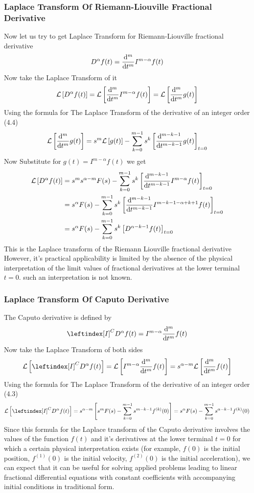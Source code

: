 \subsubsection{Laplace Transform Of Riemann-Liouville Fractional Derivative}
Now let us try to get Laplace Transform for Riemann-Liouville fractional derivative
\[
    D^{\alpha} f(t) = \dv[m]{}{t} I^{m-\alpha} f(t)
\]
Now take the Laplace Transform of it 
\[
    \mathcal{L}\left[ D^{\alpha} f(t) \right]  = \mathcal{L}\left[ \dv[m]{}{t} I^{m-\alpha} f(t) \right] = \mathcal{L}\left[ \dv[m]{}{t} g(t) \right]
\]
Using the formula for The Laplace Transform of the derivative of an integer order (4.4)
\[
    \mathcal{L}\left[ \dv[m]{}{t} g(t) \right] = s^m \mathcal{L}\left[ g(t) \right] - \sum_{k=0}^{m-1} s^k \left[\dv[m-k-1]{}{t}g(t)\right]_{t=0}
\]
Now Substitute for $g(t) = I^{m-\alpha} f(t)$ we get
\begin{align*}
    \mathcal{L}\left[ D^{\alpha} f(t) \right] &= s^m s^{\alpha-m} F(s) - \sum_{k=0}^{m-1} s^k \left[\dv[m-k-1]{}{t}I^{m-\alpha} f(t)\right]_{t=0}
    \\
    &=s^{\alpha} F(s) - \sum_{k=0}^{m-1} s^k \left[\dv[m-k-1]{}{t}I^{m-k-1-\alpha+k+1} f(t)\right]_{t=0}
    \\
    &=s^{\alpha} F(s) - \sum_{k=0}^{m-1} s^k \left[D^{\alpha-k-1} f(t)\right]_{t=0}
    \setcounter{equation}{6}
\end{align*}
This is the Laplace transform of the Riemann Liouville fractional derivative
However, it's practical applicability is limited by the absence 
of the physical interpretation of the limit values of fractional derivatives 
at the lower terminal $t = 0$. such an interpretation is not known.
\subsubsection{Laplace Transform Of Caputo Derivative}
The Caputo derivative is defined by
\[
    \leftindex[I]^C{D^\alpha} f(t) = I^{m-\alpha} \dv[m]{}{t} f(t)
\]
Now take the Laplace Transform of both sides
\[
    \mathcal{L}\left[ \leftindex[I]^C{D^\alpha} f(t) \right] = \mathcal{L}\left[ I^{m-\alpha} \dv[m]{}{t} f(t) \right] = s^{\alpha-m} \mathcal{L}\left[ \dv[m]{}{t} f(t) \right]
\]
Using the formula for The Laplace Transform of the derivative of an integer order {\footnotesize(4.3)}
\begin{align*}
    \mathcal{L}\left[ \leftindex[I]^C{D^\alpha} f(t) \right] =s^{\alpha-m}\left[s^m F(s) - \sum_{k=0}^{m-1} s^{m-k-1} f^{(k)}(0) \right]
    = s^{\alpha}F(s) - \sum_{k=0}^{m-1} s^{\alpha-k-1} f^{(k)}(0)
\end{align*}
Since this formula for the Laplace transform of the Caputo derivative
involves the values of the function $f(t)$ and it's derivatives at the lower
terminal $t=0$ for which a certain physical interpretation exists 
(for example, $f(0)$ is the initial position, $f^{(1)}(0)$ is the initial velocity, $f^{(2)}(0)$ is
the initial acceleration), we can expect that it can be useful for solving
applied problems leading to linear fractional differential equations with
constant coefficients with accompanying initial conditions in traditional
form.
\newpage
